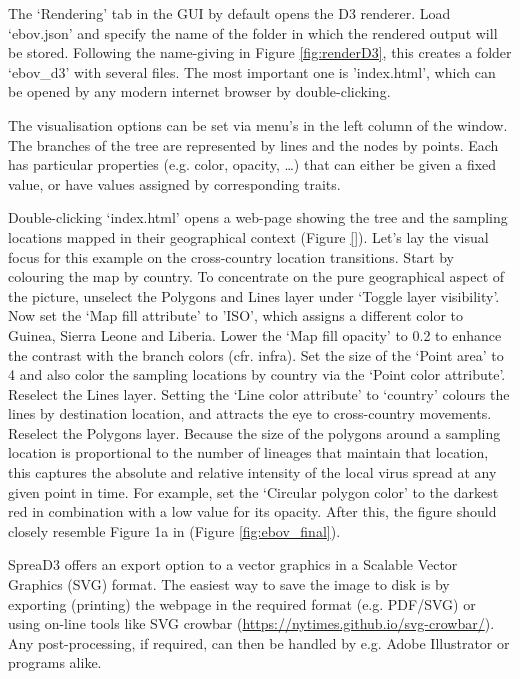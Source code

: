 \documentclass[english]{paper}
\begin{document}
The `Rendering' tab in the GUI by default opens the D3 renderer.
Load `ebov.json' and specify the name of the folder in which the rendered output will be stored. %
Following the name-giving in Figure \ref{fig:renderD3}, this creates a folder `ebov\_d3' with several files.
The most important one is 'index.html', which can be opened by any modern internet browser by double-clicking. 
\par
The visualisation options can be set via menu's in the left column of the window.
The branches of the tree are represented by lines and the nodes by points. %
Each has particular properties (e.g. color, opacity, \dots) that can either be given a fixed value, or have values assigned by corresponding traits.
\par
Double-clicking `index.html' opens a web-page showing the tree and the sampling locations mapped in their geographical context (Figure \ref{}). 
Let's lay the visual focus for this example on the cross-country location transitions.
Start by colouring the map by country. 
To concentrate on the pure geographical aspect of the picture, unselect the Polygons and Lines layer under `Toggle layer visibility'.
Now set the `Map fill attribute' to 'ISO', which assigns a different color to Guinea, Sierra Leone and Liberia.
Lower the `Map fill opacity' to 0.2 to enhance the contrast with the branch colors (cfr. infra).
Set the size of the `Point area' to 4 and also color the sampling locations by country via the `Point color attribute'.
Reselect the Lines layer.
Setting the `Line color attribute' to `country' colours the lines by destination location, and attracts the eye to cross-country movements.
Reselect the Polygons layer.
Because the size of the polygons around a sampling location is proportional to the number of lineages that maintain that location, this captures the absolute and relative intensity of the local virus spread at any given point in time.
For example, set the `Circular polygon color'  to the darkest red in combination with a low value for its opacity. 
After this, the figure should closely resemble Figure 1a in \cite{Bielejec:2016aa} (Figure \ref{fig:ebov_final}).
\par
SpreaD3 offers an export option to a vector graphics in a Scalable Vector Graphics (SVG) format.
The easiest way to save the image to disk is by exporting (printing) the webpage in the required format (e.g. PDF/SVG) or using on-line tools like SVG crowbar (\url{https://nytimes.github.io/svg-crowbar/}).
Any post-processing, if required, can then be handled by e.g. Adobe Illustrator or programs alike.
\end{document}
